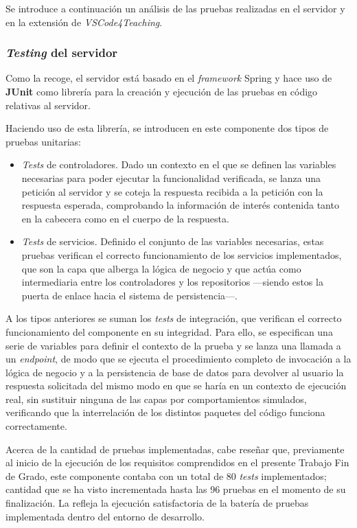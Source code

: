 Se introduce a continuación un análisis de las pruebas realizadas en el servidor y en la extensión de \textit{VSCode4Teaching}.

\subsubsection{\textit{Testing} del servidor}
Como la  recoge, el servidor está basado en el \textit{framework} Spring y hace uso de \textbf{JUnit} como librería para la creación y ejecución de las pruebas en código relativas al servidor.

Haciendo uso de esta librería, se introducen en este componente dos tipos de pruebas unitarias:
\begin{itemize}
    \item \textit{Tests} de controladores. Dado un contexto en el que se definen las variables necesarias para poder ejecutar la funcionalidad verificada, se lanza una petición al servidor y se coteja la respuesta recibida a la petición con la respuesta esperada, comprobando la información de interés contenida tanto en la cabecera como en el cuerpo de la respuesta.
    \item \textit{Tests} de servicios. Definido el conjunto de las variables necesarias, estas pruebas verifican el correcto funcionamiento de los servicios implementados, que son la capa que alberga la lógica de negocio y que actúa como intermediaria entre los controladores y los repositorios ---siendo estos la puerta de enlace hacia el sistema de persistencia---.
\end{itemize}

A los tipos anteriores se suman los \textit{tests} de integración, que verifican el correcto funcionamiento del componente en su integridad. Para ello, se especifican una serie de variables para definir el contexto de la prueba y se lanza una llamada a un \textit{endpoint}, de modo que se ejecuta el procedimiento completo de invocación a la lógica de negocio y a la persistencia de base de datos para devolver al usuario la respuesta solicitada del mismo modo en que se haría en un contexto de ejecución real, sin sustituir ninguna de las capas por comportamientos simulados, verificando que la interrelación de los distintos paquetes del código funciona correctamente.

Acerca de la cantidad de pruebas implementadas, cabe reseñar que, previamente al inicio de la ejecución de los requisitos comprendidos en el presente Trabajo Fin de Grado, este componente contaba con un total de 80 \textit{tests} implementados; cantidad que se ha visto incrementada hasta las 96 pruebas en el momento de su finalización. La  refleja la ejecución satisfactoria de la batería de pruebas implementada dentro del entorno de desarrollo.

